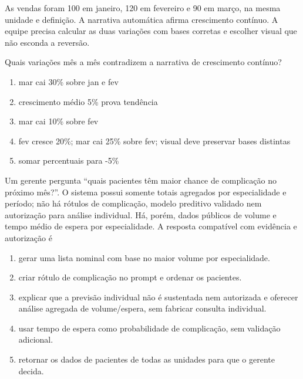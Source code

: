 
\TextoBase

As vendas foram 100 em janeiro, 120 em fevereiro e 90 em março, na mesma unidade e definição. A narrativa automática afirma crescimento contínuo. A equipe precisa calcular as duas variações com bases corretas e escolher visual que não esconda a reversão.

\FonteDidatica

\Comando Quais variações mês a mês contradizem a narrativa de crescimento contínuo?

\begin{enumerate}[label=\Alph*)]

\item mar cai 30\% sobre jan e fev

\item crescimento médio 5\% prova tendência

\item mar cai 10\% sobre fev

\item fev cresce 20\%; mar cai 25\% sobre fev; visual deve preservar bases distintas

\item somar percentuais para -5\%

\end{enumerate}

\TextoBase Um gerente pergunta ``quais pacientes têm maior chance de complicação no próximo mês?''. O sistema possui somente totais agregados por especialidade e período; não há rótulos de complicação, modelo preditivo validado nem autorização para análise individual. Há, porém, dados públicos de volume e tempo médio de espera por especialidade.
\FonteDidatica
\Comando A resposta compatível com evidência e autorização é
\begin{enumerate}[label=\Alph*)]
\item gerar uma lista nominal com base no maior volume por especialidade.
\item criar rótulo de complicação no prompt e ordenar os pacientes.
\item explicar que a previsão individual não é sustentada nem autorizada e oferecer análise agregada de volume/espera, sem fabricar consulta individual.
\item usar tempo de espera como probabilidade de complicação, sem validação adicional.
\item retornar os dados de pacientes de todas as unidades para que o gerente decida.
\end{enumerate}

